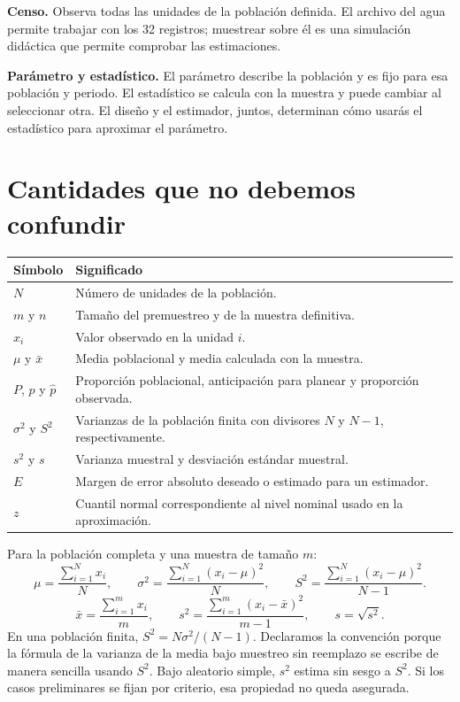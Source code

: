 \documentclass[11pt,letterpaper]{article}
\begin{document}
\textbf{Censo.} Observa todas las unidades de la población definida. El archivo del agua permite trabajar con los 32 registros; muestrear sobre él es una simulación didáctica que permite comprobar las estimaciones.

\textbf{Parámetro y estadístico.} El parámetro describe la población y es fijo para esa población y periodo. El estadístico se calcula con la muestra y puede cambiar al seleccionar otra. El diseño y el estimador, juntos, determinan cómo usarás el estadístico para aproximar el parámetro.
\clearpage
\section{Cantidades que no debemos confundir}
\begin{longtable}{p{}p{}}
\toprule\rowcolor{cabecera} Símbolo & Significado \\ \midrule
$N$ & Número de unidades de la población. \\
$m$ y $n$ & Tamaño del premuestreo y de la muestra definitiva. \\
$x_i$ & Valor observado en la unidad $i$. \\
$\mu$ y $\bar{x}$ & Media poblacional y media calculada con la muestra. \\
$P$, $p$ y $\widehat p$ & Proporción poblacional, anticipación para planear y proporción observada. \\
$\sigma^2$ y $S^2$ & Varianzas de la población finita con divisores $N$ y $N-1$, respectivamente. \\
$s^2$ y $s$ & Varianza muestral y desviación estándar muestral. \\
$E$ & Margen de error absoluto deseado o estimado para un estimador. \\
$z$ & Cuantil normal correspondiente al nivel nominal usado en la aproximación. \\
\bottomrule
\end{longtable}
Para la población completa y una muestra de tamaño $m$:
\[
\mu=\frac{\sum_{i=1}^N x_i}{N},\qquad
\sigma^2=\frac{\sum_{i=1}^N(x_i-\mu)^2}{N},\qquad
S^2=\frac{\sum_{i=1}^N(x_i-\mu)^2}{N-1}.
\]
\[
\bar{x}=\frac{\sum_{i=1}^m x_i}{m},\qquad
s^2=\frac{\sum_{i=1}^m(x_i-\bar{x})^2}{m-1},\qquad s=\sqrt{s^2}.
\]
En una población finita, $S^2=N\sigma^2/(N-1)$. Declaramos la convención porque la fórmula de la varianza de la media bajo muestreo sin reemplazo se escribe de manera sencilla usando $S^2$. Bajo aleatorio simple, $s^2$ estima sin sesgo a $S^2$. Si los casos preliminares se fijan por criterio, esa propiedad no queda asegurada.
\end{document}
